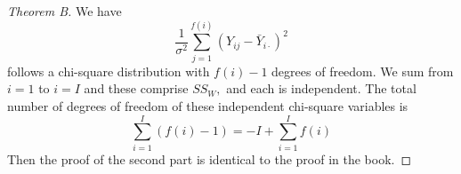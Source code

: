 \documentclass{article}
\begin{document}
\begin{itemize}
		\begin{proof}[Theorem B]
			We have \[\frac{1}{\sigma^2}\sum_{j=1}^{f(i)}(Y_{ij}-\bar{Y}_{i\cdot})^2\] follows a chi-square distribution with $f(i)-1$ degrees of freedom. We sum from $i=1$ to $i=I$ and these comprise $SS_W,$ and each is independent. The total number of degrees of freedom of these independent chi-square variables is \[\sum_{i=1}^{I} (f(i)-1)=-I+\sum_{i=1}^{I}f(i)\] Then the proof of the second part is identical to the proof in the book.
		\end{proof}
		
\end{itemize}
\end{document}
